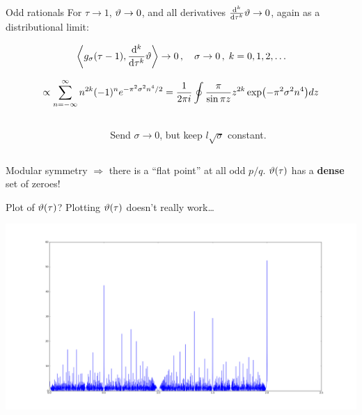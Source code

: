 \documentclass{beamer}
\begin{document}
\begin{frame}{Odd rationals}
    For $\tau \rightarrow 1$, $\vartheta \rightarrow 0$, and all derivatives $\dv[k]{\tau} \vartheta \rightarrow 0$, again as a distributional limit:

   
    \begin{equation}
        \left\langle g_\sigma(\tau-1), \dv[k]{\tau} \vartheta \right\rangle \rightarrow 0\,,\quad \sigma \rightarrow 0\,,\; k = 0,1,2,\ldots
        \label{}
    \end{equation}

    \vfill

   
    \[ \propto \sum_{n=-\infty}^\infty n^{2k} (-1)^n e^{-\pi^2 \sigma^2 n^4 / 2} = \frac{1}{2\pi i}\oint \frac{\pi}{\sin \pi z} z^{2k} \exp(-\pi^2\sigma^2 n^4) dz \]

    \begin{columns}
        \begin{column}{0.5\textwidth}
        \centering        \scalebox{0.8}{}
        \end{column}
        \begin{column}{0.5\textwidth}

        Send $\sigma \rightarrow 0$, but keep $l \sqrt{\sigma}$ constant.
        \end{column}
    \end{columns}

\end{frame}

\begin{frame}

    Modular symmetry $\Rightarrow$ there is a ``flat point'' at all odd $p/q$. $\vartheta(\tau)$ has a \textbf{dense} set of zeroes!


\end{frame}

\begin{frame}{Plot of $\vartheta(\tau)$?}
    Plotting $\vartheta(\tau)$ doesn't really work\ldots
    
    \begin{centering}
        \includegraphics[width=1.2\textwidth]{figure_1}
    \end{centering}

\end{frame}
\end{document}
